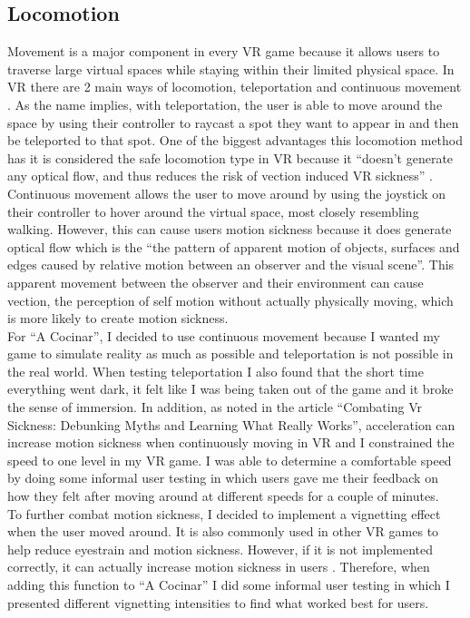 \documentclass[10pt,twocolumn]{article}
\begin{document}
\subsection{Locomotion}
Movement is a major component in every VR game because it allows users to traverse large virtual spaces while staying within their limited physical space. In VR there are 2 main ways of locomotion, teleportation and continuous movement \cite{teleportVRs2021}. As the name implies, with teleportation, the user is able to move around the space by using their controller to raycast a spot they want to appear in and then be teleported to that spot. One of the biggest advantages this locomotion method has it is considered the safe locomotion type in VR because it “doesn’t generate any optical flow, and thus reduces the risk of vection induced VR sickness” \cite{teleportOF2018}. Continuous movement allows the user to move around by using the joystick on their controller to hover around the virtual space, most closely resembling walking. However, this can cause users motion sickness because it does generate optical flow which is the “the pattern of apparent motion of objects, surfaces and edges caused by relative motion between an observer and the visual scene”\cite{teleportOF2018}. This apparent movement between the observer and their environment can cause vection, the perception of self motion without actually physically moving, which is more likely to create motion sickness. 
\\
For “A Cocinar”, I decided to use continuous movement because I wanted my game to simulate reality as much as possible and teleportation is not possible in the real world. When testing teleportation I also found that the short time everything went dark, it felt like I was being taken out of the game and it broke the sense of immersion. In addition, as noted in the article “Combating Vr Sickness: Debunking Myths and Learning What Really Works”, acceleration can increase motion sickness when continuously moving in VR and I constrained the speed to one level in my VR game\cite{vrSickness2018}. I was able to determine a comfortable speed by doing some informal user testing in which users gave me their feedback on how they felt after moving around at different speeds for a couple of minutes.  
 \\
To further combat motion sickness, I decided to implement a vignetting effect when the user moved around. It is also commonly used in other VR games to help reduce eyestrain and motion sickness. However, if it is not implemented correctly, it can actually increase motion sickness in users \cite{vignette2018}. Therefore, when adding this function to “A Cocinar” I did some informal user testing in which I presented different vignetting intensities to find what worked best for users.
\end{document}
